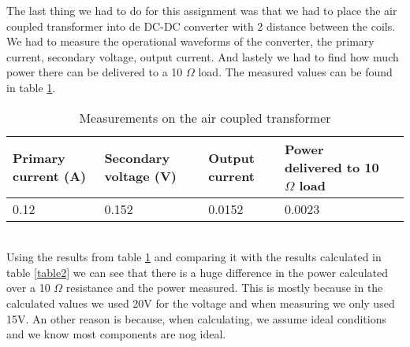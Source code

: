 \documentclass[final]{scrreprt} %
\begin{document}
The last thing we had to do for this assignment was that we had to place the air coupled transformer into de DC-DC converter with \unit{2}{\centi\meter} distance between the coils. We had to measure the operational waveforms of the converter, the primary current, secondary voltage, output current. And lastely we had to find how much power there can be delivered to a 10 $\Omega$ load.
The measured values can be found in table \ref{measure}. \\


\begin{table} [h]
\begin{center}
	\begin{tabular}{ l | l | l | l | l }
	Primary current (A) & Secondary voltage (V) & Output current & Power delivered to 10 $\Omega$ load \\ \hline
  	0.12 & 0.152 & 0.0152 & 0.0023 \\
	
	\end{tabular}
	\caption{Measurements on the air coupled transformer}
	\label{measure}
\end{center}
\end{table}
\\

Using the results from table \ref{measure} and comparing it with the results calculated in table \ref{table2} we can see that there is a huge difference in the power calculated over a 10 $\Omega$  resistance and the power measured. This is mostly because in the calculated values we used 20V for the voltage and when measuring we only used 15V. An other reason is because, when calculating, we assume ideal conditions and we know most components are nog ideal. 
\end{document}
